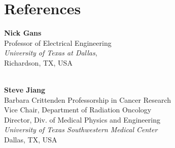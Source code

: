 \section{References}
\noindent
\begin{multicols}{2}
	
	\textbf{Nick Gans}\\
	Professor of Electrical Engineering
	\\
	\emph{University of Texas at  Dallas}, \\
     Richardson, TX, USA
	\\\\
	
%	
	\columnbreak
	
	\textbf{Steve Jiang}\\
	Barbara Crittenden Professorship in Cancer Research \\
	Vice Chair, Department of Radiation Oncology \\
	Director, Div. of Medical Physics and Engineering \\	
	\emph{University of Texas Southwestern Medical Center}\\
	Dallas, TX, USA \\
	
	
	
\end{multicols}